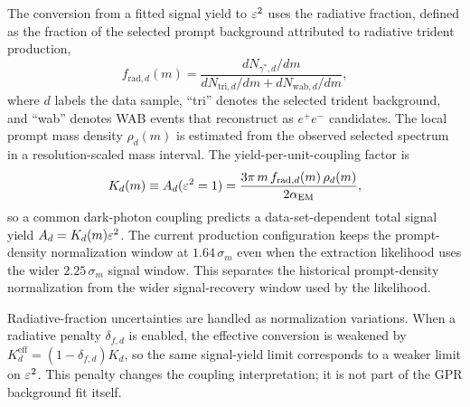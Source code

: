 The conversion from a fitted signal yield to $\varepsilon^2$ uses the radiative fraction,
defined as the fraction of the selected prompt background attributed to radiative
trident production,
\begin{equation}
f_{\mathrm{rad},d}(m)
=
\frac{dN_{\gamma^\ast,d}/dm}
{dN_{\mathrm{tri},d}/dm+dN_{\mathrm{wab},d}/dm},
\label{eq:frad}
\end{equation}
where $d$ labels the data sample, ``tri'' denotes the selected trident background, and
``wab'' denotes WAB events that reconstruct as $e^+e^-$ candidates. The local prompt
mass density $\rho_d(m)$ is estimated from the observed selected spectrum in a
resolution-scaled mass interval. The yield-per-unit-coupling factor is
\begin{equation}
K_d(m)\equiv A_d(\varepsilon^2=1)
=
\frac{3\pi\,m\,f_{\mathrm{rad},d}(m)\,\rho_d(m)}
{2\alpha_{\mathrm{EM}}},
\label{eq:kd}
\end{equation}
so a common dark-photon coupling predicts a data-set-dependent total signal yield
$A_d=K_d(m)\varepsilon^2$. The current production configuration keeps the prompt-density
normalization window at $1.64\,\sigma_m$ even when the extraction likelihood uses the
wider $2.25\,\sigma_m$ signal window. This separates the historical prompt-density
normalization from the wider signal-recovery window used by the likelihood.

Radiative-fraction uncertainties are handled as normalization variations. When a
radiative penalty $\delta_{f,d}$ is enabled, the effective conversion is weakened by
$K_d^{\mathrm{eff}}=(1-\delta_{f,d})K_d$, so the same signal-yield limit corresponds
to a weaker limit on $\varepsilon^2$. This penalty changes the coupling interpretation; it is
not part of the GPR background fit itself.
